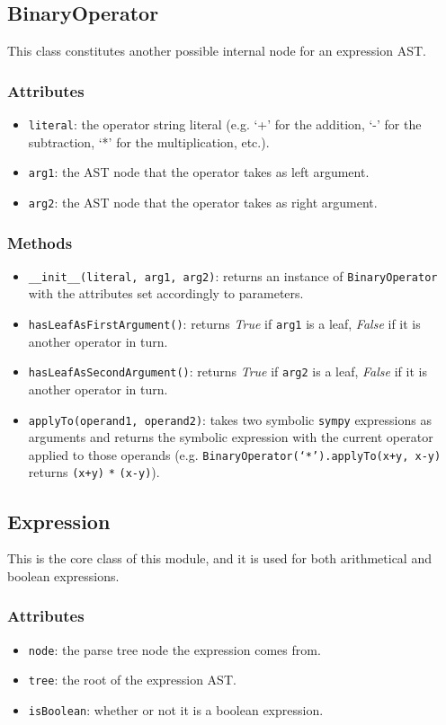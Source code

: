 \documentclass[12pt,a4paper]{report}
\theoremstyle{definition}
\theoremstyle{definition}
\theoremstyle{definition}
\begin{document}
\subsection{BinaryOperator}
This class constitutes another possible internal node for an expression AST.
\subsubsection{Attributes}
\begin{itemize}
    \itemsep 0em
    \item \texttt{literal}: the operator string literal (e.g. `+' for the addition, `-' for the subtraction, `*' for the multiplication, etc.).
    \item \texttt{arg1}: the AST node that the operator takes as left argument.
    \item \texttt{arg2}: the AST node that the operator takes as right argument.
\end{itemize}
\subsubsection{Methods}
\begin{itemize}
    \itemsep 0em
    \item \texttt{\_\_init\_\_(literal, arg1, arg2)}: returns an instance of \texttt{BinaryOperator} with the attributes set accordingly to parameters.
    \item \texttt{hasLeafAsFirstArgument()}: returns \textit{True} if \texttt{arg1} is a leaf, \textit{False} if it is another operator in turn.
    \item \texttt{hasLeafAsSecondArgument()}: returns \textit{True} if \texttt{arg2} is a leaf, \textit{False} if it is another operator in turn.
    \item \texttt{applyTo(operand1, operand2)}: takes two symbolic \texttt{sympy} expressions as arguments and returns the symbolic expression with the current operator applied to those operands (e.g. \texttt{BinaryOperator(`*').applyTo(x+y, x-y)} returns \texttt{(x+y)} \texttt{*} \texttt{(x-y)}).
\end{itemize}

\subsection{Expression}
This is the core class of this module, and it is used for both arithmetical and boolean expressions.
\subsubsection{Attributes}
\begin{itemize}
    \itemsep 0em
    \item \texttt{node}: the parse tree node the expression comes from.
    \item \texttt{tree}: the root of the expression AST.
    \item \texttt{isBoolean}: whether or not it is a boolean expression.
\end{itemize}
\end{document}
